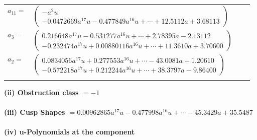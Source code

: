 \documentclass[1p]{elsarticle_modified}
\theoremstyle{definition}
\begin{document}
\begin{tabular}{m{7pt} m{180pt} m{7pt} m{180pt} }
\flushright $a_{11}=$&$\begin{pmatrix}- a^2 u\\-0.0472669 a^{17} u-0.477849 a^{16} u+\cdots+12.5112 a+3.68113\end{pmatrix}$ \\
\flushright $a_{3}=$&$\begin{pmatrix}0.216648 a^{17} u-0.531277 a^{16} u+\cdots+2.78395 a-2.13112\\-0.232474 a^{17} u+0.00880116 a^{16} u+\cdots+11.3610 a+3.70600\end{pmatrix}$ \\
\flushright $a_{2}=$&$\begin{pmatrix}0.0834056 a^{17} u+0.277553 a^{16} u+\cdots-43.0081 a+1.20610\\-0.572218 a^{17} u+0.212244 a^{16} u+\cdots+38.3797 a-9.86400\end{pmatrix}$\\&\end{tabular}
\flushleft \textbf{(ii) Obstruction class $= -1$}\\~\\
\flushleft \textbf{(iii) Cusp Shapes $= 0.00962865 a^{17} u-0.477998 a^{16} u+\cdots-45.3429 a+35.5487$}\\~\\
\newpage\renewcommand{\arraystretch}{1}
\flushleft \textbf{(iv) u-Polynomials at the component}\newline \\
\end{document}
